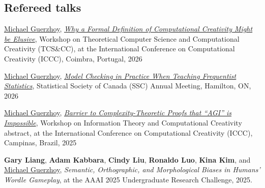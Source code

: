 \documentclass[letterpaper,11pt]{article}
\begin{document}
\subsection*{Refereed talks}
\begin{revnumerate}
    \item
    \underline{Michael Guerzhoy}, \href{https://philevents.org/event/show/148293}{\textit{Why a Formal Definition of Computational Creativity Might be Elusive}}, Workshop on Theoretical Computer Science and Computational Creativity (TCS\&CC), at the International Conference on Computational Creativity (ICCC), Coimbra, Portugal, 2026
    \item
    \underline{Michael Guerzhoy}, \href{https://ssc.ca/en/meeting/annual/presentation/model-checking-practice-when-teaching-frequentist-statistics}{\textit{Model Checking in Practice When Teaching Frequentist Statistics}}, Statistical Society of Canada (SSC) Annual Meeting, Hamilton, ON, 2026 
	\item
	\underline{Michael Guerzhoy}, \href{https://cs.uwaterloo.ca/~browndg/CC_IT_workshop/schedule.shtml}{\textit{Barrier to Complexity-Theoretic Proofs that ``AGI'' is Impossible}}, Workshop on Information Theory and Computational Creativity abstract, at the International Conference on Computational Creativity (ICCC), Campinas, Brazil, 2025

\item \textbf{Gary Liang}, \textbf{Adam Kabbara}, \textbf{Cindy Liu}, \textbf{Ronaldo Luo}, \textbf{Kina Kim}, and \underline{Michael Guerzhoy}, \textit{Semantic, Orthographic, and Morphological Biases in Humans' Wordle Gameplay}, at the AAAI 2025 Undergraduate Research Challenge, 2025. 
    

\end{revnumerate}
\end{document}
